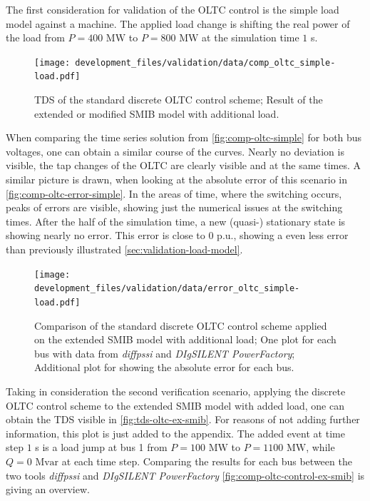 The first consideration for validation of the \acs{OLTC} control is the simple load model against a machine.
The applied load change is shifting the real power of the load from $P=400\text{ MW}$ to $P=800\text{ MW}$ at the simulation time $1$ s.

\begin{figure}[htbp!]
    \centering
    \texttt{[image: development\_files/validation/data/comp\_oltc\_simple-load.pdf]}
    \caption[Time Domain Result of the OLTC control scheme applied on the extended \acs{SMIB} network]{\acf{TDS} of the standard discrete \acs{OLTC} control scheme; Result of the extended or modified \acs{SMIB} model with additional load.}
    \label{fig:comp-oltc-simple}
\end{figure}

When comparing the time series solution from \autoref{fig:comp-oltc-simple} for both bus voltages, one can obtain a similar course of the curves. 
Nearly no deviation is visible, the tap changes of the \acs{OLTC} are clearly visible and at the same times.
A similar picture is drawn, when looking at the absolute error of this scenario in \autoref{fig:comp-oltc-error-simple}.
In the areas of time, where the switching occurs, peaks of errors are visible, showing just the numerical issues at the switching times.
After the half of the simulation time, a new (quasi-) stationary state is showing nearly no error.
This error is close to $0$ p.u., showing a even less error than previously illustrated \autoref{sec:validation-load-model}.

\begin{figure}[htbp!]
    \centering
    \texttt{[image: development\_files/validation/data/error\_oltc\_simple-load.pdf]}
    \caption[Bus and Error Comparison for the standard discrete \acs{OLTC} scheme applied on the extended \acs{SMIB} model with load]{Comparison of the standard discrete \acs{OLTC} control scheme applied on the extended \acs{SMIB} model with additional load; One plot for each bus with data from \textit{diffpssi} and \textit{DIgSILENT PowerFactory}; Additional plot for showing the absolute error for each bus.}
    \label{fig:comp-oltc-error-simple}
\end{figure}

Taking in consideration the second verification scenario, applying the discrete \acs{OLTC} control scheme to the extended \acs{SMIB} model with added load, one can obtain the \acs{TDS} visible in \autoref{fig:tds-oltc-ex-smib}.
For reasons of not adding further information, this plot is just added to the appendix.
The added event at time step $1$ s is a load jump at bus 1 from $P=100\text{ MW}$ to $P=1100\text{ MW}$, while $Q=0\text{ Mvar}$ at each time step.
Comparing the results for each bus between the two tools \textit{diffpssi} and \textit{DIgSILENT PowerFactory} \autoref{fig:comp-oltc-control-ex-smib} is giving an overview.

